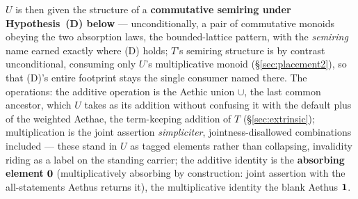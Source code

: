 \begin{defin}
$U$ is then given the structure of a \textbf{commutative semiring under Hypothesis~(D) below} --- unconditionally, a pair of commutative monoids obeying the two absorption laws, the bounded-lattice pattern, with the \emph{semiring} name earned exactly where (D) holds; $T$'s semiring structure is by contrast unconditional, consuming only $U$'s multiplicative monoid (\S\ref{sec:placement2}), so that (D)'s entire footprint stays the single consumer named there. The operations: the additive operation is the Aethic union $\cup$, the last common ancestor, which $U$ takes as its addition without confusing it with the default plus of the weighted Aethae, the term-keeping addition of $T$ (\S\ref{sec:extrinsic}); multiplication is the joint assertion \emph{simpliciter}, jointness-disallowed combinations included --- these stand in $U$ as tagged elements rather than collapsing, invalidity riding as a label on the standing carrier; the additive identity is the \textbf{absorbing element} $\mathbf{0}$ (multiplicatively absorbing by construction: joint assertion with the all-statements Aethus returns it), the multiplicative identity the blank Aethus $\mathbf{1}$.

\end{defin}
